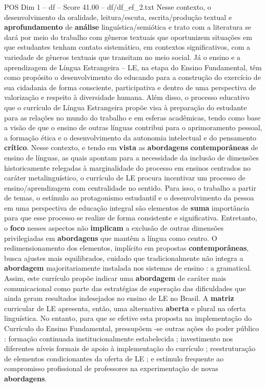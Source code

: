 \begin{textsample}{POS Dim 1 – df – Score 41.00 – df/df\_ef\_2.txt}
Nesse contexto, o desenvolvimento da oralidade, leitura/escuta, escrita/produção textual e \textbf{aprofundamento} de \textbf{análise} linguística/semiótica e trato com a literatura se dará por meio do trabalho com gêneros textuais que oportunizem situações em que estudantes tenham contato sistemático, em contextos significativos, com a variedade de gêneros textuais que transitam no meio social.
Já o ensino e a aprendizagem de Língua Estrangeira – LE, na etapa do Ensino Fundamental, têm como propósito o desenvolvimento do educando para a construção do exercício de sua cidadania de forma consciente, participativa e dentro de uma perspectiva de valorização e respeito à diversidade humana.
Além disso, o processo educativo que o currículo de Língua Estrangeira propõe visa à preparação do estudante para as relações no mundo do trabalho e em esferas acadêmicas, tendo como base a visão de que o ensino de outras línguas contribui para o aprimoramento pessoal, a formação ética e o desenvolvimento da autonomia intelectual e do pensamento \textbf{crítico}.
Nesse contexto, e tendo em \textbf{vista} as \textbf{abordagens} \textbf{contemporâneas} de ensino de línguas, as quais apontam para a necessidade da inclusão de dimensões historicamente relegadas à marginalidade do processo em ensinos centrados no caráter metalinguístico, o currículo de LE procura incentivar um processo de ensino/aprendizagem com centralidade no sentido.
Para isso, o trabalho a partir de temas, o estímulo ao protagonismo estudantil e o desenvolvimento da pessoa em uma perspectiva de educação integral são elementos de \textbf{suma} importância para que esse processo se realize de forma consistente e significativa.
Entretanto, o \textbf{foco} nesses aspectos não \textbf{implicam} a exclusão de outras dimensões privilegiadas em \textbf{abordagens} que mantêm a língua como centro.
O redimensionamento dos elementos, implícito em propostas \textbf{contemporâneas}, busca ajustes mais equilibrados, cuidado que tradicionalmente não integra a \textbf{abordagem} majoritariamente instalada nos sistemas de ensino : a gramatical.
Assim, este currículo propõe indicar uma \textbf{abordagem} de caráter mais comunicacional como parte das estratégias de superação das dificuldades que ainda geram resultados indesejados no ensino de LE no Brasil.
A \textbf{matriz} curricular de LE apresenta, então, uma alternativa \textbf{aberta} e plural na oferta linguística.
No entanto, para que se efetive esta proposta na implementação do Currículo do Ensino Fundamental, pressupõem -se outras ações do poder público : formação continuada institucionalmente estabelecida ; investimento nos diferentes níveis formais de apoio à implementação do currículo ; reestruturação de elementos condicionantes da oferta de LE ; e estímulo frequente ao compromisso profissional de professores na experimentação de novas \textbf{abordagens}.

\end{textsample}
